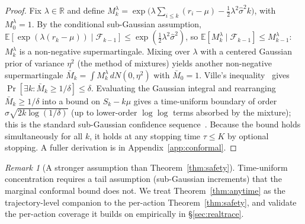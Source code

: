 \documentclass[11pt]{article}
\theoremstyle{plain}
\theoremstyle{definition}
\theoremstyle{remark}
\newtheorem{remark}{Remark}
\begin{document}
\begin{proof}
Fix $\lambda\in\mathbb{R}$ and define $M_k^\lambda=\exp\!\big(\lambda\sum_{i\le k}(r_i-\mu)-\tfrac12\lambda^2\hat\sigma^2 k\big)$, with $M_0^\lambda=1$. By the conditional sub-Gaussian assumption, $\mathbb{E}[\exp(\lambda(r_k-\mu))\mid\mathcal F_{k-1}]\le \exp(\tfrac12\lambda^2\hat\sigma^2)$, so $\mathbb{E}[M_k^\lambda\mid\mathcal F_{k-1}]\le M_{k-1}^\lambda$: $M_k^\lambda$ is a non-negative supermartingale. Mixing over $\lambda$ with a centered Gaussian prior of variance $\eta^2$ (the method of mixtures) yields another non-negative supermartingale $\bar M_k=\int M_k^\lambda\,dN(0,\eta^2)$ with $\bar M_0=1$. Ville's inequality~\cite{ramdas2023} gives $\Pr[\exists k: \bar M_k\ge 1/\delta]\le\delta$. Evaluating the Gaussian integral and rearranging $\bar M_k\ge1/\delta$ into a bound on $S_k-k\mu$ gives a time-uniform boundary of order $\hat\sigma\sqrt{2k\log(1/\delta)}$ (up to lower-order $\log\log$ terms absorbed by the mixture); this is the standard sub-Gaussian confidence sequence~\cite{howard2021}. Because the bound holds simultaneously for all $k$, it holds at any stopping time $\tau\le K$ by optional stopping. A fuller derivation is in Appendix~\ref{app:conformal}. \end{proof}

\begin{remark}[A stronger assumption than Theorem~\ref{thm:safety}]
Time-uniform concentration requires a tail assumption (sub-Gaussian increments) that the marginal conformal bound does not. We treat Theorem~\ref{thm:anytime} as the trajectory-level companion to the per-action Theorem~\ref{thm:safety}, and validate the per-action coverage it builds on empirically in \S\ref{sec:realtrace}.
\end{remark}
\end{document}
